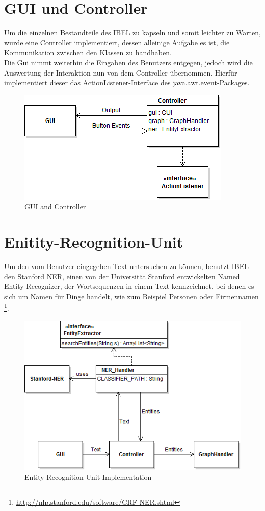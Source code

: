 \documentclass[11pt, a4paper, oneside]{Thesis} %
\begin{document}
\section{GUI und Controller}
Um die einzelnen Bestandteile des IBEL zu kapseln und somit leichter zu Warten, wurde eine Controller implementiert, dessen alleinige Aufgabe es ist, die Kommunikation zwischen den Klassen zu handhaben. \\
Die Gui nimmt weiterhin die Eingaben des Benutzers entgegen, jedoch wird die Auswertung der Interaktion nun von dem Controller \"ubernommen. Hierf\"ur implementiert dieser das ActionListener-Interface des java.awt.event-Packages.
\begin{figure}[ht!]
\centering
\includegraphics[scale=0.55]{./guiCont.png}
\caption[GUI and Controller]{GUI and Controller}
\end{figure}

\section{Enitity-Recognition-Unit}
Um den vom Benutzer eingegeben Text untersuchen zu k\"onnen, benutzt IBEL den Stanford NER, einen von der Universit\"at Stanford entwickelten Named Entity Recognizer, der Wortsequenzen in einem Text kennzeichnet, bei denen es sich um Namen f\"ur Dinge handelt, wie zum Beispiel Personen oder Firmennamen \footnote{\url{http://nlp.stanford.edu/software/CRF-NER.shtml}}. 
\begin{figure}[ht!]
\centering
\includegraphics[scale=0.55]{./eruImp.png}
\caption[Entity-Recognition-Unit Impl.]{Entity-Recognition-Unit Implementation}
\end{figure}
\end{document}
